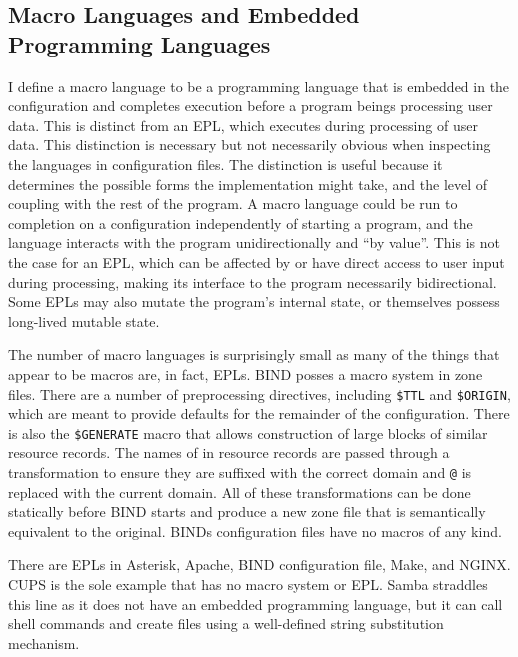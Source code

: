 \documentclass[letterpaper,twocolumn,10pt]{article}
\begin{document}
\subsection{Macro Languages and Embedded Programming Languages}
I define a macro language to be a programming language that is embedded in the configuration and completes execution before a program beings processing user data. This is distinct from an EPL, which executes during processing of user data. This distinction is necessary but not necessarily obvious when inspecting the languages in configuration files. The distinction is useful because it determines the possible forms the implementation might take, and the level of coupling with the rest of the program. A macro language could be run to completion on a configuration independently of starting a program, and the language interacts with the program unidirectionally and ``by value''. This is not the case for an EPL, which can be affected by or have direct access to user input during processing, making its interface to the program necessarily bidirectional. Some EPLs may also mutate the program's internal state, or themselves possess long-lived mutable state.

The number of macro languages is surprisingly small as many of the things that appear to be macros are, in fact, EPLs. BIND posses a macro system in zone files. There are a number of preprocessing directives, including \texttt{\$TTL} and \texttt{\$ORIGIN}, which are meant to provide defaults for the remainder of the configuration. There is also the \texttt{\$GENERATE} macro that allows construction of large blocks of similar resource records. The names of in resource records are passed through a transformation to ensure they are suffixed with the correct domain and \texttt{@} is replaced with the current domain. All of these transformations can be done statically before BIND starts and produce a new zone file that is semantically equivalent to the original. BINDs configuration files have no macros of any kind.

There are EPLs in Asterisk, Apache, BIND configuration file, Make, and NGINX. CUPS is the sole example that has no macro system or EPL. Samba straddles this line as it does not have an embedded programming language, but it can call shell commands and create files using a well-defined string substitution mechanism.
\end{document}

